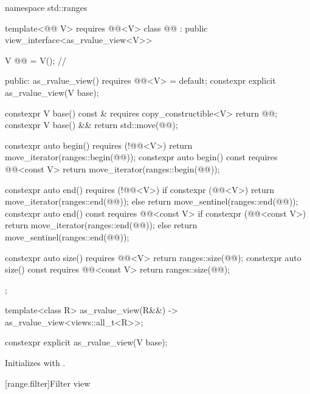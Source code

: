 \begin{codeblock}
namespace std::ranges {
  template<@@ V>
    requires @@<V>
  class @@ : public view_interface<as_rvalue_view<V>>
  {
    V @@ = V();      // \expos

  public:
    as_rvalue_view() requires @@<V> = default;
    constexpr explicit as_rvalue_view(V base);

    constexpr V base() const & requires copy_constructible<V> { return @@; }
    constexpr V base() && { return std::move(@@); }

    constexpr auto begin() requires (!@@<V>)
      { return move_iterator(ranges::begin(@@)); }
    constexpr auto begin() const requires @@<const V>
      { return move_iterator(ranges::begin(@@)); }

    constexpr auto end() requires (!@@<V>) {
      if constexpr (@@<V>) {
        return move_iterator(ranges::end(@@));
      } else {
        return move_sentinel(ranges::end(@@));
      }
    }
    constexpr auto end() const requires @@<const V> {
      if constexpr (@@<const V>) {
        return move_iterator(ranges::end(@@));
      } else {
        return move_sentinel(ranges::end(@@));
      }
    }

    constexpr auto size() requires @@<V> { return ranges::size(@@); }
    constexpr auto size() const requires @@<const V> { return ranges::size(@@); }
  };

  template<class R>
    as_rvalue_view(R&&) -> as_rvalue_view<views::all_t<R>>;
}
\end{codeblock}

%
\begin{itemdecl}
constexpr explicit as_rvalue_view(V base);
\end{itemdecl}

\begin{itemdescr}
\pnum
\effects
Initializes  with .
\end{itemdescr}

[range.filter]{Filter view}

